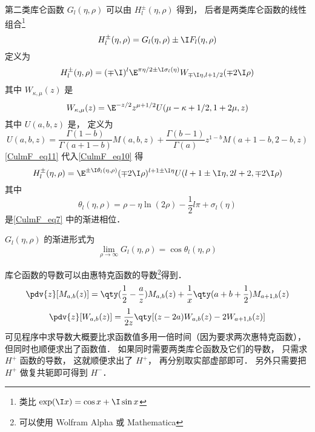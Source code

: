 第二类库仑函数 $G_l(\eta, \rho)$ 可以由 $H_l^\pm(\eta, \rho)$ 得到， 后者是两类库仑函数的线性组合\footnote{类比 $\exp(\I x) = \cos x + \I\sin x$}
\begin{equation}
H_l^\pm(\eta, \rho) = G_l(\eta, \rho) \pm \I F_l(\eta, \rho)
\end{equation}	
定义为
\begin{equation}\label{CulmF_eq10}
H_l^\pm(\eta, \rho) = (\mp\I)^l \E^{\pi\eta/2 \pm \I \sigma_l(\eta)} W_{\mp\I\eta, l + 1/2}(\mp 2\I\rho)
\end{equation}
其中 $W_{\kappa, \mu}(z)$ 是
\begin{equation}\label{CulmF_eq11}
W_{\kappa, \mu}(z) = \E^{-z/2} z^{\mu + 1/2} U(\mu - \kappa + 1/2, 1 + 2\mu, z)
\end{equation}
其中 $U(a, b, z)$ 是， 定义为
\begin{equation}
U(a, b, z) = \frac{\Gamma(1 - b)}{\Gamma(a + 1 - b)} M(a, b, z) + \frac{\Gamma(b - 1)}{\Gamma(a)} z^{1 - b} M(a + 1 - b, 2 - b, z)
\end{equation}
\autoref{CulmF_eq11} 代入\autoref{CulmF_eq10} 得
\begin{equation}
H_l^\pm(\eta, \rho) = \E^{\pm\I\theta_l(\eta, \rho)}(\mp 2\I\rho)^{l + 1 \pm\I\eta} U(l + 1 \pm \I\eta, 2l + 2, \mp2\I\rho)
\end{equation}
其中
\begin{equation}
\theta_l(\eta, \rho) = \rho - \eta\ln(2\rho) - \frac12 l\pi + \sigma_l(\eta)
\end{equation}
是\autoref{CulmF_eq7} 中的渐进相位．

$G_l(\eta,\rho)$ 的渐进形式为
\begin{equation}
\lim_{\rho\to \infty} G_l(\eta, \rho) = \cos\theta_l(\eta, \rho)
\end{equation}

库仑函数的导数可以由惠特克函数的导数\footnote{可以使用 Wolfram Alpha 或 Mathematica}得到．
\begin{equation}
\pdv{z} [M_{a, b}(z)] = \qty(\frac12 - \frac{a}{z}) M_{a, b}(z) + \frac{1}{x} \qty(a + b + \frac12) M_{a+1, b}(z)
\end{equation}
\begin{equation}
\pdv{z} [W_{a, b}(z)] = \frac{1}{2z} \qty[(z - 2a) W_{a, b}(z) - 2W_{a+1, b}(z)]
\end{equation}
可见程序中求导数大概要比求函数值多用一倍时间（因为要求两次惠特克函数）， 但同时也顺便求出了函数值． 如果同时需要两类库仑函数及它们的导数， 只需求 $H^+$ 函数的导数， 这就顺便求出了 $H^+$， 再分别取实部虚部即可． 另外只需要把 $H^+$ 做复共轭即可得到 $H^-$．

